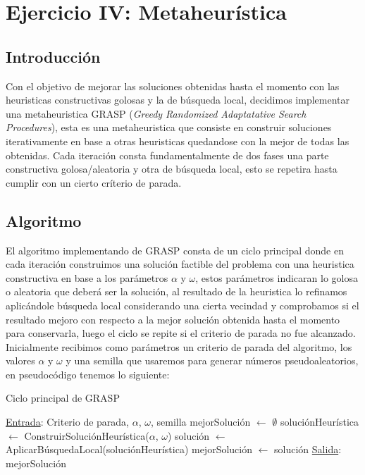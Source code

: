 \section{Ejercicio IV: Metaheur\'istica}

\subsection{Introducci\'on}

Con el objetivo de mejorar las soluciones obtenidas hasta el momento con las heuristicas constructivas golosas y la de búsqueda local, decidimos implementar una metaheuristica GRASP (\textit{Greedy Randomized Adaptatative Search Procedures}), esta es una metaheuristica que consiste en construir soluciones iterativamente en base a otras heuristicas quedandose con la mejor de todas las obtenidas. Cada iteración consta fundamentalmente de dos fases una parte constructiva golosa/aleatoria y otra de búsqueda local, esto se repetira hasta cumplir con un cierto críterio de parada.

\subsection{Algoritmo}

El algoritmo implementando de GRASP consta de un ciclo principal donde en cada iteración construimos una solución factible del problema con una heuristica constructiva en base a los parámetros $\alpha$ y $\omega$, estos parámetros indicaran lo golosa o aleatoria que deberá ser la solución, al resultado de la heuristica lo refinamos aplicándole búsqueda local considerando una cierta vecindad y comprobamos si el resultado mejoro con respecto a la mejor solución obtenida hasta el momento para conservarla, luego el ciclo se repite si el criterio de parada no fue alcanzado. Inicialmente recibimos como parámetros un criterio de parada del algoritmo, los valores $\alpha$ y $\omega$ y una semilla que usaremos para generar números pseudoaleatorios, en pseudocódigo tenemos lo siguiente:


\begin{algorithm}[H]

\label{}
\caption{Ciclo principal de GRASP}

\begin{algorithmic}[1]

\Statex \underline{Entrada}: Criterio de parada, $\alpha$, $\omega$, semilla
\medskip
\State mejorSoluci\'on $\gets$ $\emptyset$
    \State soluci\'onHeur\'istica $\gets$ ConstruirSoluci\'onHeur\'istica($\alpha$, $\omega$)
	\State soluci\'on $\gets$ AplicarB\'usquedaLocal(soluci\'onHeur\'istica)
		\State mejorSoluci\'on $\gets$ soluci\'on
	\EndIf
\EndWhile
\medskip
\Statex \underline{Salida}: mejorSoluci\'on

\end{algorithmic}
\end{algorithm}


